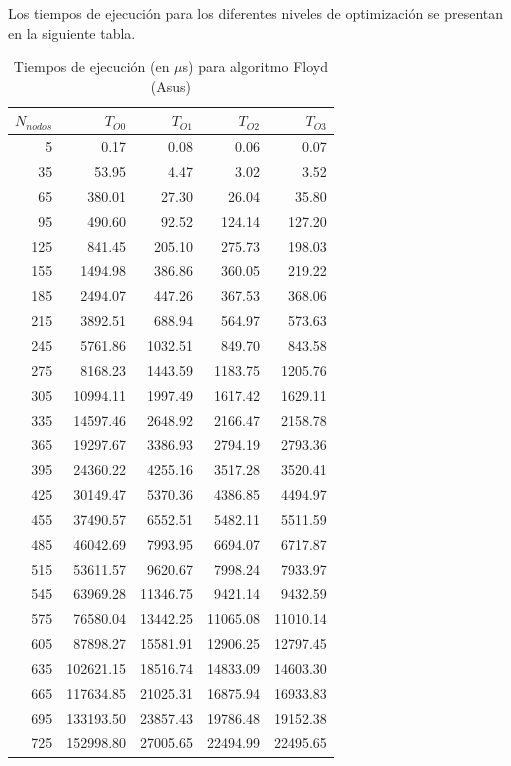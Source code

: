 \documentclass{homework}
\begin{document}

    Los tiempos de ejecución para los diferentes niveles de optimización se presentan en la siguiente tabla. 

    \begin{table}[h]
        \centering
        \begin{tabular}{|r|r|r|r|r|}
            \hline
            $N_{nodos}$ & $T_{O0}$ & $T_{O1}$ & $T_{O2}$ & $T_{O3}$ \\
            \hline
            5 & 0.17 & 0.08 & 0.06 & 0.07 \\ 
            35 & 53.95 & 4.47 & 3.02 & 3.52 \\ 
            65 & 380.01 & 27.30 & 26.04 & 35.80 \\ 
            95 & 490.60 & 92.52 & 124.14 & 127.20 \\ 
            125 & 841.45 & 205.10 & 275.73 & 198.03 \\ 
            155 & 1494.98 & 386.86 & 360.05 & 219.22 \\ 
            185 & 2494.07 & 447.26 & 367.53 & 368.06 \\ 
            215 & 3892.51 & 688.94 & 564.97 & 573.63 \\ 
            245 & 5761.86 & 1032.51 & 849.70 & 843.58 \\ 
            275 & 8168.23 & 1443.59 & 1183.75 & 1205.76 \\ 
            305 & 10994.11 & 1997.49 & 1617.42 & 1629.11 \\ 
            335 & 14597.46 & 2648.92 & 2166.47 & 2158.78 \\ 
            365 & 19297.67 & 3386.93 & 2794.19 & 2793.36 \\ 
            395 & 24360.22 & 4255.16 & 3517.28 & 3520.41 \\ 
            425 & 30149.47 & 5370.36 & 4386.85 & 4494.97 \\ 
            455 & 37490.57 & 6552.51 & 5482.11 & 5511.59 \\ 
            485 & 46042.69 & 7993.95 & 6694.07 & 6717.87 \\ 
            515 & 53611.57 & 9620.67 & 7998.24 & 7933.97 \\ 
            545 & 63969.28 & 11346.75 & 9421.14 & 9432.59 \\ 
            575 & 76580.04 & 13442.25 & 11065.08 & 11010.14 \\ 
            605 & 87898.27 & 15581.91 & 12906.25 & 12797.45 \\ 
            635 & 102621.15 & 18516.74 & 14833.09 & 14603.30 \\ 
            665 & 117634.85 & 21025.31 & 16875.94 & 16933.83 \\ 
            695 & 133193.50 & 23857.43 & 19786.48 & 19152.38 \\ 
            725 & 152998.80 & 27005.65 & 22494.99 & 22495.65 \\ 
            \hline
        \end{tabular}
        \caption{Tiempos de ejecución (en $\mu$s) para algoritmo Floyd (Asus)}
    \end{table}
\end{document}
